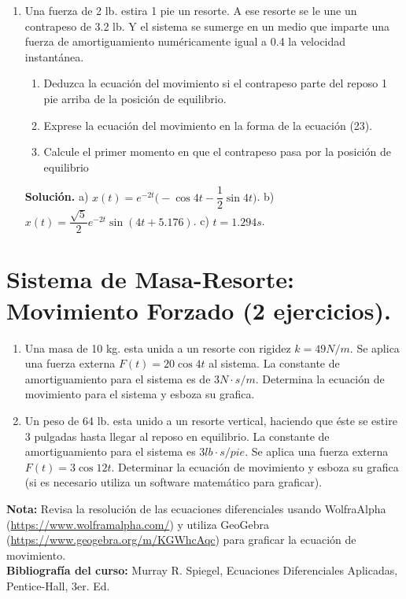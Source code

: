 \documentclass[letterpaper,10pt]{memoir}
\begin{document}
\begin{enumerate}
	\item Una fuerza de 2 lb. estira 1 pie un resorte. A ese resorte se le une un contrapeso de 3.2 lb. Y el sistema se sumerge en un medio que imparte una fuerza de amortiguamiento numéricamente igual a 0.4 la velocidad instantánea.
		\begin{enumerate}
			\item Deduzca la ecuación del movimiento si el contrapeso parte del reposo 1 pie arriba de la posición de equilibrio.
			\item Exprese la ecuación del movimiento en la forma de la ecuación (23).
			\item Calcule el primer momento en que el contrapeso pasa por la posición de equilibrio
		\end{enumerate}
		\begin{flushright}
			\textbf{Solución.} a) \(x(t) =e^{-2t} \Bigg(- \cos 4t- \dfrac{1}{2} \sin 4t\Bigg)\). b) \(x(t) = \dfrac{\sqrt{5}}{2} e^{-2t} \sin (4t+5.176)\). c) \(t=1.294s\).
		\end{flushright}
\end{enumerate}

\section*{Sistema de Masa-Resorte: Movimiento Forzado (2 ejercicios).} %
\begin{enumerate}
	\item Una masa de 10 kg. esta unida a un resorte con rigidez \(k=49N/m\). Se aplica una fuerza externa \(F(t) = 20 \cos 4t\) al sistema. La constante de amortiguamiento para el sistema es de \(3N \cdot s/m\). Determina la ecuación de movimiento para el sistema y esboza su grafica.
	\item Un peso de 64 lb. esta unido a un resorte vertical, haciendo que éste se estire 3 pulgadas hasta llegar al reposo en equilibrio. La constante de amortiguamiento para el sistema es \(3lb \cdot s/pie\). Se aplica una fuerza externa \(F(t) =3 \cos 12t\). Determinar la ecuación de movimiento y esboza su grafica (si es necesario utiliza un software matemático para graficar).
\end{enumerate}

\textbf{Nota:} Revisa la resolución de las ecuaciones diferenciales usando WolfraAlpha (\url{https://www.wolframalpha.com/}) y utiliza GeoGebra (\url{https://www.geogebra.org/m/KGWhcAqc}) para graficar la ecuación de movimiento. \\[5mm]
\textbf{Bibliografía del curso:} Murray R. Spiegel, Ecuaciones Diferenciales Aplicadas, Pentice-Hall, 3er. Ed.
\end{document}
